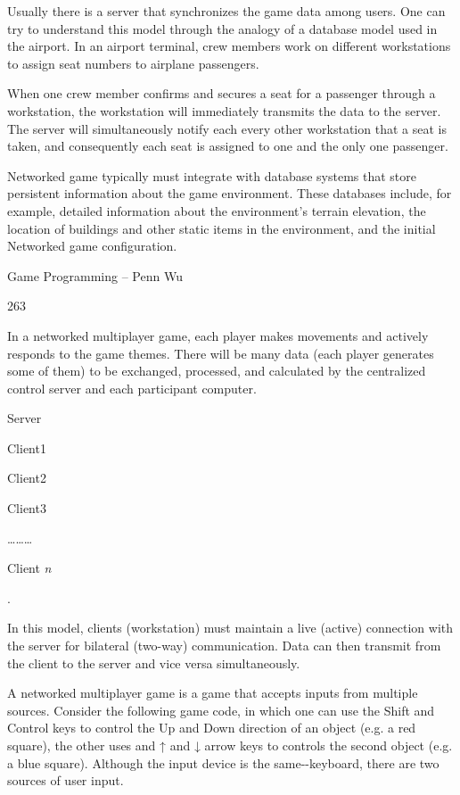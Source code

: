 \documentclass[
]{article}
\begin{document}
Usually there is a server that synchronizes the game data among users.
One can try to understand this model through the analogy of a database
model used in the airport. In an airport terminal, crew members work on
different workstations to assign seat numbers to airplane passengers.

When one crew member confirms and secures a seat for a passenger through
a workstation, the workstation will immediately transmits the data to
the server. The server will simultaneously notify each every other
workstation that a seat is taken, and consequently each seat is assigned
to one and the only one passenger.

Networked game typically must integrate with database systems that store
persistent information about the game environment. These databases
include, for example, detailed information about the environment's
terrain elevation, the location of buildings and other static items in
the environment, and the initial Networked game configuration.

Game Programming -- Penn Wu

263

\protect\hypertarget{index_split_014.htmlux5cux23p264}{}{}

In a networked multiplayer game, each player makes movements and
actively responds to the game themes. There will be many data (each
player generates some of them) to be exchanged, processed, and
calculated by the centralized control server and each participant
computer.

Server

Client1

Client2

Client3

\ldots\ldots\ldots{}

Client \emph{n}

.

In this model, clients (workstation) must maintain a live (active)
connection with the server for bilateral (two-way) communication. Data
can then transmit from the client to the server and vice versa
simultaneously.

A networked multiplayer game is a game that accepts inputs from multiple
sources. Consider the following game code, in which one can use the
Shift and Control keys to control the Up and Down direction of an object
(e.g. a red square), the other uses and ↑ and ↓ arrow keys to controls
the second object (e.g. a blue square). Although the input device is the
same-\/-keyboard, there are two sources of user input.
\end{document}
